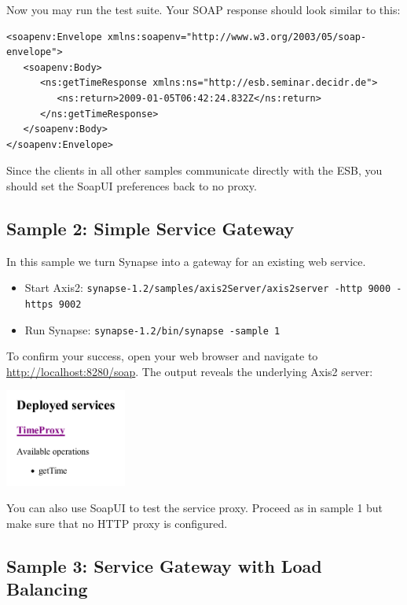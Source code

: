 Now you may run the test suite. Your SOAP response should look similar to this: 

\lstset{caption=, label=sample-1-result-xml}
\begin{lstlisting}
<soapenv:Envelope xmlns:soapenv="http://www.w3.org/2003/05/soap-envelope">
   <soapenv:Body>
      <ns:getTimeResponse xmlns:ns="http://esb.seminar.decidr.de">
         <ns:return>2009-01-05T06:42:24.832Z</ns:return>
      </ns:getTimeResponse>
   </soapenv:Body>
</soapenv:Envelope>
\end{lstlisting}

Since the clients in all other samples communicate directly with the ESB, you
should set the SoapUI preferences back to no proxy.

\subsection{Sample 2: Simple Service Gateway}
\label{sec:sample-2}

In this sample we turn Synapse into a gateway for an existing web service.

\begin{itemize}
  \item Start Axis2: \texttt{synapse-1.2/samples/axis2Server/axis2server -http
  9000 -https 9002}
  \item Run Synapse: \texttt{synapse-1.2/bin/synapse -sample 1}
\end{itemize}

\lstset{caption=, label=sample-2-xml}


To confirm your success, open your web browser and navigate to
\url{http://localhost:8280/soap}. The output reveals the underlying
Axis2 server:

\begin{center}
\includegraphics[width=4cm]{figures/timeproxy-success.pdf}
\end{center}

You can also use SoapUI to test the service proxy. Proceed as in sample 1 but
make sure that no HTTP proxy is configured.

\subsection{Sample 3: Service Gateway with Load Balancing}
\label{sec:sample-3}

